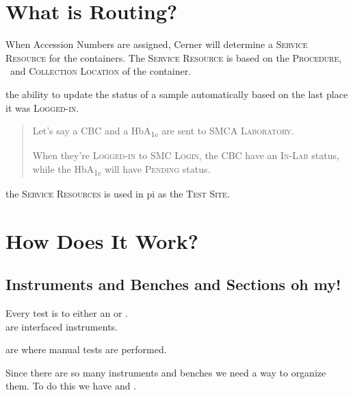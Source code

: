 \section{What is Routing?}

When Accession Numbers are assigned, Cerner will determine a \textsc{Service Resource} for the containers. The \textsc{Service Resource} is based on the \textsc{Procedure}, \ and \textsc{Collection Location} of the container.


 the ability to update the status of a sample automatically based on the last place it was \textsc{Logged-in.}

\begin{quote}
     Let's say a CBC and a HbA\textsubscript{1c} are sent to \textsc{SMCA Laboratory}.

    When they're \textsc{Logged-in} to \textsc{SMC Login}, the CBC have an \textsc{In-Lab} status, while the HbA\textsubscript{1c} will have \textsc{Pending} status.
\end{quote}


 the \textsc{Service Resources} is used in \gls{pi} as the \textsc{Test Site}.

\section{How Does It Work?}

\subsection{Instruments and Benches and Sections oh my!}

Every test is  to either an  or .\\

 are interfaced instruments.

 are where manual tests are performed.

 Since there are so many instruments and benches we need a way to organize them. To do this we have  and .\\

